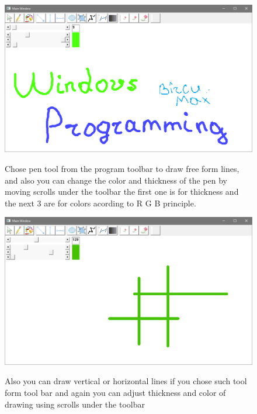 \begin{figure}[h!]
  \centering
    {%
      \includegraphics[width=1\textwidth]{6}}
  \caption{Chose pen tool from the program toolbar to draw free form lines, and also you can change the color and thickness of the pen by moving scrolls under the toolbar the first one is for thickness and the next 3 are for colors acording to R G B principle.}
\end{figure}

  
\begin{figure}[h!]
  \centering
    {%
      \includegraphics[width=1\textwidth]{5}}
  \caption{Also you can draw vertical or horizontal lines if you chose such tool form tool bar and again you can adjust thickness and color of drawing using scrolls under the toolbar}
\end{figure}


